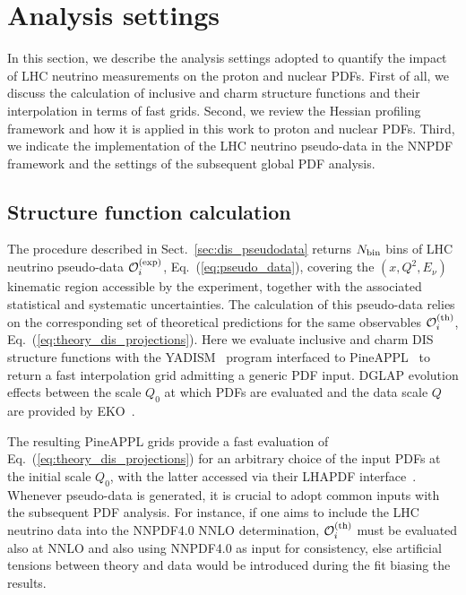 \clearpage
\section{Analysis settings}
\label{sec:settings}

In this section, we describe the analysis settings adopted to quantify
the impact of LHC neutrino measurements on the proton and nuclear PDFs.
%
First of all, we discuss the calculation of inclusive and charm structure functions
and their interpolation in terms of fast grids. 
%
Second, we review the Hessian profiling framework and how it is applied
in this work to proton and nuclear PDFs.
%
Third, we indicate the implementation of the LHC neutrino pseudo-data in the
NNPDF framework and the settings of the subsequent global PDF analysis.

\subsection{Structure function calculation}
\label{subsec:dis_sf_calculations}

The procedure described in Sect.~\ref{sec:dis_pseudodata} returns
$N_{\rm bin}$ bins of LHC neutrino pseudo-data $\mathcal{O}_i^{{\rm (exp)}}$, Eq.~(\ref{eq:pseudo_data}), covering the $(x,Q^2,E_\nu)$ kinematic region accessible by the experiment,
together with the associated statistical and systematic uncertainties.
%
The calculation of this pseudo-data relies on the corresponding set of
theoretical predictions for the same observables $\mathcal{O}_i^{{\rm (th)}}$,
Eq.~(\ref{eq:theory_dis_projections}).
%
Here we evaluate inclusive and charm DIS structure functions with the
{\sc\small YADISM}~\cite{yadism,Candido:2023utz} program
interfaced to {\sc\small PineAPPL}~\cite{Carrazza:2020gss, christopher_schwan_2023_7995675}
to return a fast interpolation grid admitting a generic PDF input.
%
DGLAP evolution effects between the scale $Q_0$ at which PDFs are evaluated
and the data scale $Q$ are provided by {\sc\small EKO}~\cite{Candido:2022tld}.

The resulting {\sc\small PineAPPL} grids provide a fast evaluation
of Eq.~(\ref{eq:theory_dis_projections}) for an arbitrary choice of the
input PDFs at the initial scale $Q_0$, with the latter accessed via their
{\sc\small LHAPDF} interface~\cite{Buckley:2014ana}.
%
Whenever pseudo-data is generated, it is crucial to adopt common inputs with
the subsequent PDF analysis.
%
For instance, if one aims to include the LHC neutrino data into the NNPDF4.0
NNLO determination, $\mathcal{O}_i^{{\rm (th)}}$ must be evaluated also at NNLO
and also using
NNPDF4.0 as input for consistency, else artificial tensions between theory
and data would be introduced during the fit biasing the results.

